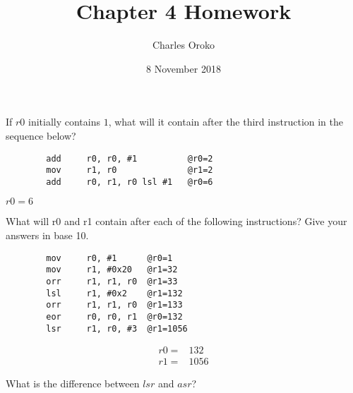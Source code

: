 \documentclass[12pt]{article}
\newenvironment{problem}[2][Problem]{\begin{trivlist}
\item[\hskip \labelsep {\bfseries #1}\hskip \labelsep {\bfseries #2.}]}{\end{trivlist}}
\begin{document}
 
 
\title{Chapter 4 Homework}%
\author{Charles Oroko} %
\date{8 November 2018}
\maketitle


\begin{problem}{4.1}
    If $r0$ initially contains $1$, what will it contain after the third instruction in the sequence below?
    \begin{verbatim}
        add     r0, r0, #1          @r0=2
        mov     r1, r0              @r1=2
        add     r0, r1, r0 lsl #1   @r0=6
    \end{verbatim}

\end{problem}

$r0=6$


\begin{problem}{4.2}
    What will r0 and r1 contain after each of the following instructions? Give your answers in base 10.
    \begin{verbatim}
        mov     r0, #1      @r0=1
        mov     r1, #0x20   @r1=32
        orr     r1, r1, r0  @r1=33
        lsl     r1, #0x2    @r1=132
        orr     r1, r1, r0  @r1=133
        eor     r0, r0, r1  @r0=132
        lsr     r1, r0, #3  @r1=1056
    \end{verbatim}

\end{problem}

\begin{align*}
    r0 = & 132 \\
    r1 = & 1056
\end{align*}


\begin{problem}{4.3}
    What is the difference between $lsr$ and $asr$?
\end{problem}
\end{document}
